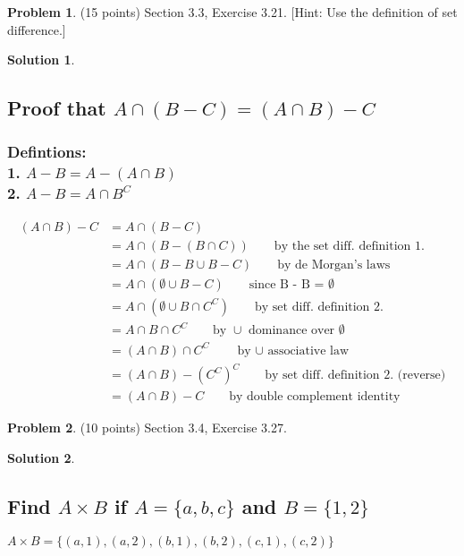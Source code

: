\documentclass{article}
\theoremstyle{definition}
\newtheorem{problem}{Problem}
\newtheorem*{solution}{Solution}
\begin{document}
\newpage
\begin{problem} (15 points) Section 3.3, Exercise 3.21.
[Hint: Use the definition of set difference.]
\end{problem}
\begin{solution}
\hspace{1cm}
\subsection*{Proof that $A \cap (B - C) = (A \cap B) - C$}
\subsubsection*{Defintions:\\ 1. $A - B = A - (A \cap B)$\\
2. $A - B = A \cap B^{C}$}
\begin{align}
(A \cap B) - C &= A \cap (B - C)\\
&= A \cap (B - (B \cap C)) \quad \quad \mbox{by the set diff. definition 1.}\\
&= A \cap (B - B \cup B - C) \quad \quad \mbox{by de Morgan's laws}\\
&= A \cap (\emptyset \cup B - C) \quad \quad \mbox{since B - B = $\emptyset$}\\
&= A \cap (\emptyset \cup B \cap C^{C}) \quad \quad \mbox{by set diff. definition 2.}\\
&= A \cap B \cap C^{C} \quad \quad \mbox{by $\cup$ dominance over $\emptyset$}\\
&= (A \cap B) \cap C^{C} \quad \quad \mbox{by $\cup$ associative law}\\
&=  (A \cap B) - (C^{C})^{C} \quad \quad \mbox{by set diff. definition 2. (reverse)}\\
&= (A \cap B) - C \quad \quad \mbox{by double complement identity}
\end{align}
\setcounter{equation}{0} 
\end{solution}

\newpage
\begin{problem} (10 points) Section 3.4, Exercise 3.27.
\end{problem}
\begin{solution}
\hspace{1cm}
\subsection*{Find $A \times B$ if $A = \{a,b,c\}$ and $B = \{1,2\}$}
$A \times B = \{(a,1),(a,2),(b,1),(b,2),(c,1),(c,2)\}$
\end{solution}
\end{document}
